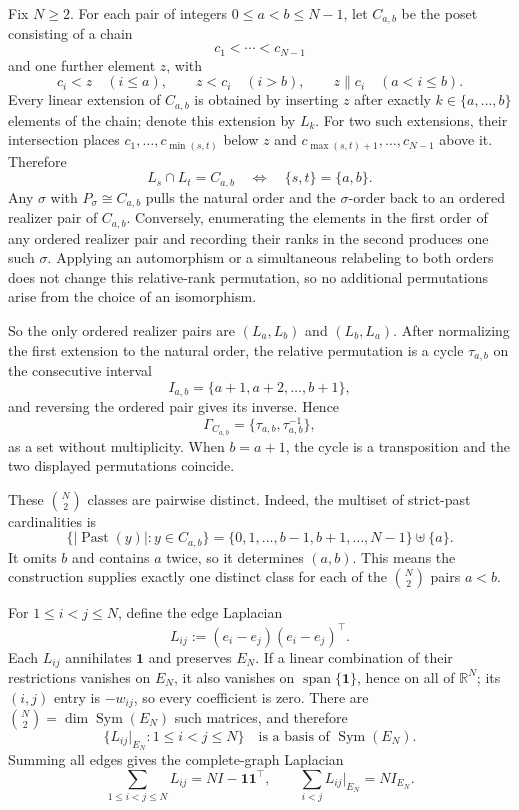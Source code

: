 \documentclass[11pt]{article}
\begin{document}
Fix \(N\ge2\). For each pair of integers \(0\le a<b\le N-1\), let \(C_{a,b}\) be the poset consisting of a chain \[ c_1<\cdots<c_{N-1} \tag{C.1} \] and one further element \(z\), with \[ c_i<z\quad(i\le a), \qquad z<c_i\quad(i>b), \qquad z\parallel c_i\quad(a<i\le b). \tag{C.2} \] Every linear extension of \(C_{a,b}\) is obtained by inserting \(z\) after exactly \(k\in\{a,\ldots,b\}\) elements of the chain; denote this extension by \(L_k\). For two such extensions, their intersection places \(c_1,\ldots,c_{\min(s,t)}\) below \(z\) and \(c_{\max(s,t)+1},\ldots,c_{N-1}\) above it. Therefore \[ L_s\cap L_t=C_{a,b} \quad\Longleftrightarrow\quad \{s,t\}=\{a,b\}. \tag{C.3} \] Any \(\sigma\) with \(P_\sigma\cong C_{a,b}\) pulls the natural order and the \(\sigma\)-order back to an ordered realizer pair of \(C_{a,b}\). Conversely, enumerating the elements in the first order of any ordered realizer pair and recording their ranks in the second produces one such \(\sigma\). Applying an automorphism or a simultaneous relabeling to both orders does not change this relative-rank permutation, so no additional permutations arise from the choice of an isomorphism.

So the only ordered realizer pairs are \((L_a,L_b)\) and \((L_b,L_a)\). After normalizing the first extension to the natural order, the relative permutation is a cycle \(\tau_{a,b}\) on the consecutive interval \[ I_{a,b}=\{a+1,a+2,\ldots,b+1\}, \tag{C.4} \] and reversing the ordered pair gives its inverse. Hence \[ \Gamma_{C_{a,b}} =\{\tau_{a,b},\tau_{a,b}^{-1}\}, \tag{C.5} \] as a set without multiplicity. When \(b=a+1\), the cycle is a transposition and the two displayed permutations coincide.

These \(\binom N2\) classes are pairwise distinct. Indeed, the multiset of strict-past cardinalities is \[ \bigl\{|\operatorname{Past}(y)|:y\in C_{a,b}\bigr\} =\{0,1,\ldots,b-1,b+1,\ldots,N-1\}\uplus\{a\}. \tag{C.6} \] It omits \(b\) and contains \(a\) twice, so it determines \((a,b)\). This means the construction supplies exactly one distinct class for each of the \(\binom N2\) pairs \(a<b\).

For \(1\le i<j\le N\), define the edge Laplacian \[ L_{ij}:=(e_i-e_j)(e_i-e_j)^\top. \tag{C.7} \] Each \(L_{ij}\) annihilates \(\mathbf1\) and preserves \(E_N\). If a linear combination of their restrictions vanishes on \(E_N\), it also vanishes on \(\operatorname{span}\{\mathbf1\}\), hence on all of \(\mathbb R^N\); its \((i,j)\) entry is \(-w_{ij}\), so every coefficient is zero. There are \(\binom N2=\dim\operatorname{Sym}(E_N)\) such matrices, and therefore \[ \{L_{ij}|_{E_N}:1\le i<j\le N\} \quad\text{is a basis of }\operatorname{Sym}(E_N). \tag{C.8} \] Summing all edges gives the complete-graph Laplacian \[ \sum_{1\le i<j\le N}L_{ij} =NI-\mathbf1\mathbf1^\top, \qquad \sum_{i<j}L_{ij}|_{E_N}=NI_{E_N}. \tag{C.9} \]
\end{document}
